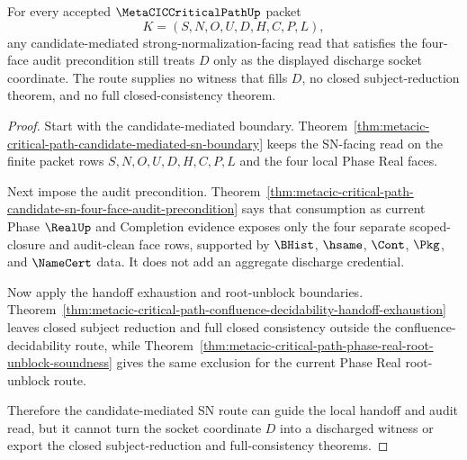 \begin{theorem}
\label{thm:metacic-critical-path-candidate-route-discharge-refusal}
For every accepted $\MetaCICCriticalPathUp$ packet
$$
K=(S,N,O,U,D,H,C,P,L),
$$
any candidate-mediated strong-normalization-facing read that satisfies the four-face audit precondition still treats $D$ only as the displayed discharge socket coordinate. The route supplies no witness that fills $D$, no closed subject-reduction theorem, and no full closed-consistency theorem.
\end{theorem}
\begin{proof}
Start with the candidate-mediated boundary. Theorem~\ref{thm:metacic-critical-path-candidate-mediated-sn-boundary} keeps the SN-facing read on the finite packet rows $S,N,O,U,D,H,C,P,L$ and the four local Phase Real faces.

Next impose the audit precondition. Theorem~\ref{thm:metacic-critical-path-candidate-sn-four-face-audit-precondition} says that consumption as current Phase $\RealUp$ and Completion evidence exposes only the four separate scoped-closure and audit-clean face rows, supported by $\BHist$, $\hsame$, $\Cont$, $\Pkg$, and $\NameCert$ data. It does not add an aggregate discharge credential.

Now apply the handoff exhaustion and root-unblock boundaries. Theorem~\ref{thm:metacic-critical-path-confluence-decidability-handoff-exhaustion} leaves closed subject reduction and full closed consistency outside the confluence-decidability route, while Theorem~\ref{thm:metacic-critical-path-phase-real-root-unblock-soundness} gives the same exclusion for the current Phase Real root-unblock route.

Therefore the candidate-mediated SN route can guide the local handoff and audit read, but it cannot turn the socket coordinate $D$ into a discharged witness or export the closed subject-reduction and full-consistency theorems.
\end{proof}

